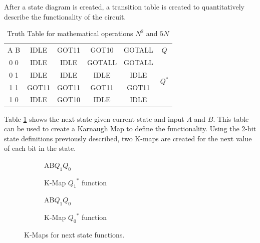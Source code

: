 \documentclass[CMPE]{KGCOEReport}
\begin{document}
After a state diagram is created, a transition table is created to quantitatively describe the functionality of the circuit.

\begin{table}[h]
\renewcommand{\arraystretch}{1.2}
\setlength{\tabcolsep}{12pt}
\caption{Truth Table for mathematical operations \(N^2\) and \(5N\)}
\begin{center}
\begin{tabular}{c||c|c|c|cc}
A B & IDLE  & GOT11 & GOT10  & GOTALL & $Q$\\\hhline{=||=|=|=|=}
0 0 & IDLE  & IDLE  & GOTALL & GOTALL & \multirow{4}{*}{$Q^*$}\\\cline{1-5}
0 1 & IDLE  & IDLE  & IDLE   & IDLE   & \\\cline{1-5}
1 1 & GOT11 & GOT11 & GOT11  & GOT11  & \\\cline{1-5}
1 0 & IDLE  & GOT10 & IDLE   & IDLE   &

\end{tabular}
\end{center}
\label{tab:func}
\end{table}

Table \ref{tab:func} shows the next state given current state and input $A$ and $B$. This table can be used to create a Karnaugh Map to define the functionality. Using the 2-bit state definitions previously described, two K-maps are created for the next value of each bit in the state.

\begin{figure}[h!]
	\begin{subfigure}{.5\textwidth}
		\centering
		\begin{Karnaugh}{AB}{$Q_1Q_0$}
		\end{Karnaugh}
		\caption{K-Map ${Q_1}^*$ function}
		\label{fig:q1}
	\end{subfigure}
	\begin{subfigure}{.5\textwidth}
		\centering
		\begin{Karnaugh}{AB}{$Q_1Q_0$}
		\end{Karnaugh}
		\caption{K-Map ${Q_0}^*$ function}
		\label{fig:q0}
	\end{subfigure}
	
	\caption{K-Maps for next state functions.}
	\label{fig:kmap}
\end{figure}
\end{document}
